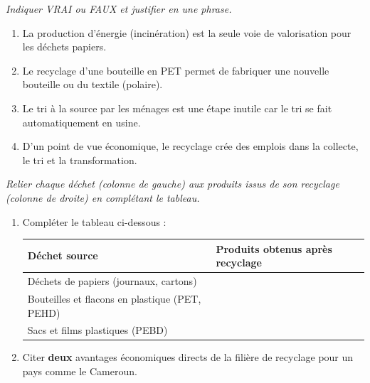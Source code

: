 \documentclass[11pt]{article}
\begin{document}
\begin{exercice}
\emph{Indiquer VRAI ou FAUX et justifier en une phrase.}
\begin{enumerate}
    \item La production d'énergie (incinération) est la seule voie de valorisation pour les déchets papiers.
    \item Le recyclage d'une bouteille en PET permet de fabriquer une nouvelle bouteille ou du textile (polaire).
    \item Le tri à la source par les ménages est une étape inutile car le tri se fait automatiquement en usine.
    \item D'un point de vue économique, le recyclage crée des emplois dans la collecte, le tri et la transformation.
\end{enumerate}
\end{exercice}

\begin{exercice}
\emph{Relier chaque déchet (colonne de gauche) aux produits issus de son recyclage (colonne de droite) en complétant le tableau.}
\begin{enumerate}
    \item Compléter le tableau ci-dessous :
    \vspace{6pt}
    \begin{center}
    \begin{tabular}{|>{\raggedright\arraybackslash}p{5.5cm}|>{\raggedright\arraybackslash}p{9cm}|}
    \hline
    \textbf{Déchet source} & \textbf{Produits obtenus après recyclage} \\
    \hline
    Déchets de papiers (journaux, cartons) & \dotfill \\
    \hline
    Bouteilles et flacons en plastique (PET, PEHD) & \dotfill \\
    \hline
    Sacs et films plastiques (PEBD) & \dotfill \\
    \hline
    \end{tabular}
    \end{center}
    \vspace{6pt}
    \item Citer \textbf{deux} avantages économiques directs de la filière de recyclage pour un pays comme le Cameroun.
\end{enumerate}
\end{exercice}
\end{document}
